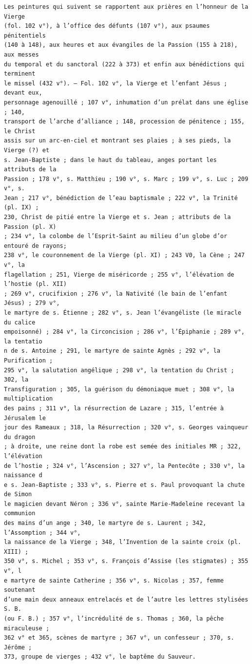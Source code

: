 \documentclass[a4paper,12pt,twoside]{book}
\begin{document}
\begin{verbatim}
Les peintures qui suivent se rapportent aux prières en l’honneur de la Vierge 
(fol. 102 v°), à l’office des défunts (107 v°), aux psaumes pénitentiels
(140 à 148), aux heures et aux évangiles de la Passion (155 à 218), aux messes 
du temporal et du sanctoral (222 à 373) et enfin aux bénédictions qui terminent 
le missel (432 v°). — Fol. 102 v°, la Vierge et l’enfant Jésus ; devant eux,
personnage agenouillé ; 107 v°, inhumation d’un prélat dans une église ; 140,
transport de l’arche d’alliance ; 148, procession de pénitence ; 155, le Christ 
assis sur un arc-en-ciel et montrant ses plaies ; à ses pieds, la Vierge (?) et 
s. Jean-Baptiste ; dans le haut du tableau, anges portant les attributs de la 
Passion ; 178 v°, s. Matthieu ; 190 v°, s. Marc ; 199 v°, s. Luc ; 209 v°, s.
Jean ; 217 v°, bénédiction de l’eau baptismale ; 222 v°, la Trinité (pl. IX) ;
230, Christ de pitié entre la Vierge et s. Jean ; attributs de la Passion (pl. X) 
; 234 v°, la colombe de l’Esprit-Saint au milieu d’un globe d’or entouré de rayons;
238 v°, le couronnement de la Vierge (pl. XI) ; 243 V0, la Cène ; 247 v°, la
flagellation ; 251, Vierge de miséricorde ; 255 v°, l’élévation de l’hostie (pl. XII)
; 269 v°, crucifixion ; 276 v°, la Nativité (le bain de l’enfant Jésus) ; 279 v°,
le martyre de s. Étienne ; 282 v°, s. Jean l’évangéliste (le miracle du calice
empoisonné) ; 284 v°, la Circoncision ; 286 v°, l’Épiphanie ; 289 v°, la tentatio
n de s. Antoine ; 291, le martyre de sainte Agnès ; 292 v°, la Purification ; 
295 v°, la salutation angélique ; 298 v°, la tentation du Christ ; 302, la
Transfiguration ; 305, la guérison du démoniaque muet ; 308 v°, la multiplication
des pains ; 311 v°, la résurrection de Lazare ; 315, l’entrée à Jérusalem le
jour des Rameaux ; 318, la Résurrection ; 320 v°, s. Georges vainqueur du dragon 
; à droite, une reine dont la robe est semée des initiales MR ; 322, l’élévation 
de l’hostie ; 324 v°, l’Ascension ; 327 v°, la Pentecôte ; 330 v°, la naissance d
e s. Jean-Baptiste ; 333 v°, s. Pierre et s. Paul provoquant la chute de Simon
le magicien devant Néron ; 336 v°, sainte Marie-Madeleine recevant la communion
des mains d’un ange ; 340, le martyre de s. Laurent ; 342, l’Assomption ; 344 v°, 
la naissance de la Vierge ; 348, l’Invention de la sainte croix (pl. XIII) ; 
350 v°, s. Michel ; 353 v°, s. François d’Assise (les stigmates) ; 355 v°, l
e martyre de sainte Catherine ; 356 v°, s. Nicolas ; 357, femme soutenant
d’une main deux anneaux entrelacés et de l’autre les lettres stylisées S. B. 
(ou F. B.) ; 357 v°, l’incrédulité de s. Thomas ; 360, la pêche miraculeuse ;
362 v° et 365, scènes de martyre ; 367 v°, un confesseur ; 370, s. Jérôme ;
373, groupe de vierges ; 432 v°, le baptême du Sauveur.


\end{verbatim}
\end{document}
